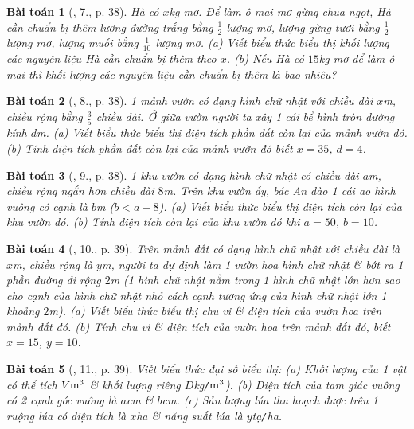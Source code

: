 \documentclass{article}
\newtheorem{baitoan}{Bài toán}
\begin{document}
\begin{baitoan}[\cite{SBT_Toan_7_Canh_Dieu_tap_2}, 7., p. 38]
	Hà có $x$\emph{kg} mơ. Để làm ô mai mơ gừng chua ngọt, Hà cần chuẩn bị thêm lượng đường trắng bằng $\frac{1}{2}$ lượng mơ, lượng gừng tươi bằng $\frac{1}{2}$ lượng mơ, lượng muối bằng $\frac{1}{10}$ lượng mơ. (a) Viết biểu thức biểu thị khối lượng các nguyên liệu Hà cần chuẩn bị thêm theo $x$. (b) Nếu Hà có $15$\emph{kg} mơ để làm ô mai thì khối lượng các nguyên liệu cần chuẩn bị thêm là bao nhiêu?
\end{baitoan}

\begin{baitoan}[\cite{SBT_Toan_7_Canh_Dieu_tap_2}, 8., p. 38]
	1 mảnh vườn có dạng hình chữ nhật với chiều dài $x$\emph{m}, chiều rộng bằng $\frac{3}{5}$ chiều dài. Ở giữa vườn người ta xây 1 cái bể hình tròn đường kính $d$\emph{m}. (a) Viết biểu thức biểu thị diện tích phần đất còn lại của mảnh vườn đó. (b) Tính diện tích phần đất còn lại của mảnh vườn đó biết $x = 35$, $d = 4$.
\end{baitoan}

\begin{baitoan}[\cite{SBT_Toan_7_Canh_Dieu_tap_2}, 9., p. 38]
	1 khu vườn có dạng hình chữ nhật có chiều dài $a$\emph{m}, chiều rộng ngắn hơn chiều dài $8$\emph{m}. Trên khu vườn ấy, bác An đào 1 cái ao hình vuông có cạnh là $b$\emph{m} ($b < a - 8$). (a) Viết biểu thức biểu thị diện tích còn lại của khu vườn đó. (b) Tính diện tích còn lại của khu vườn đó khi $a = 50$, $b = 10$.
\end{baitoan}

\begin{baitoan}[\cite{SBT_Toan_7_Canh_Dieu_tap_2}, 10., p. 39]
	Trên mảnh đất có dạng hình chữ nhật với chiều dài là $x$\emph{m}, chiều rộng là $y$\emph{m}, người ta dự định làm 1 vườn hoa hình chữ nhật \& bớt ra 1 phần đường đi rộng $2$\emph{m} (1 hình chữ nhật nằm trong 1 hình chữ nhật lớn hơn sao cho cạnh của hình chữ nhật nhỏ cách cạnh tương ứng của hình chữ nhật lớn 1 khoảng $2$\emph{m}). (a) Viết biểu thức biểu thị chu vi \& diện tích của vườn hoa trên mảnh đất đó. (b) Tính chu vi \& diện tích của vườn hoa trên mảnh đất đó, biết $x = 15$, $y = 10$.
\end{baitoan}

\begin{baitoan}[\cite{SBT_Toan_7_Canh_Dieu_tap_2}, 11., p. 39]
	Viết biểu thức đại số biểu thị: (a) Khối lượng của 1 vật có thể tích $V{\rm m}^3$ \& khối lượng riêng $D$\emph{kg\texttt{/}$\rm m^3$}). (b) Diện tích của tam giác vuông có 2 cạnh góc vuông là $a$\emph{cm} \& $b$\emph{cm}. (c) Sản lượng lúa thu hoạch được trên 1 ruộng lúa có diện tích là $x$\emph{ha} \& năng suất lúa là $y$\emph{tạ\texttt{/}ha}.
\end{baitoan}
\end{document}
